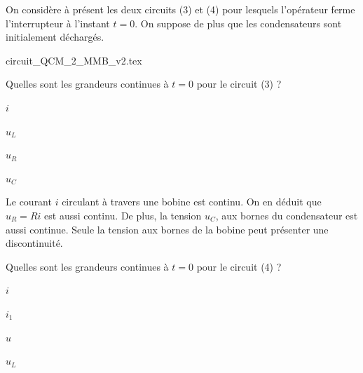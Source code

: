 On considère à présent les deux circuits (3) et (4) pour lesquels l'opérateur ferme l'interrupteur à l'instant $t=0$. On suppose de plus que les condensateurs sont initialement déchargés.
\begin{center}
{circuit_QCM_2_MMB_v2.tex}
\end{center}


\repriseEntrainement



\begin{enonce}
	Quelles sont les grandeurs continues à $t=0$ pour le circuit (3) ?
	
	\begin{listeQCM4Colonnes}
	\item $i$
	\item $u_L$
	\item $u_R$
	\item $u_C$
	\end{listeQCM4Colonnes}
\end{enonce}


\begin{corrige}
Le courant $i$ circulant à travers une bobine est continu. On en déduit que $u_R = Ri$ est aussi continu. De plus, la tension $u_C$, aux bornes du condensateur est aussi continue. Seule la tension aux bornes de la bobine peut présenter une discontinuité.
\end{corrige}




\begin{enonce}
	Quelles sont les grandeurs continues à $t=0$ pour le circuit (4) ?
	
	\begin{listeQCM4Colonnes}
	\item $i$
	\item $i_1$
	\item $u$
	\item $u_L$
	\end{listeQCM4Colonnes}
\end{enonce}


